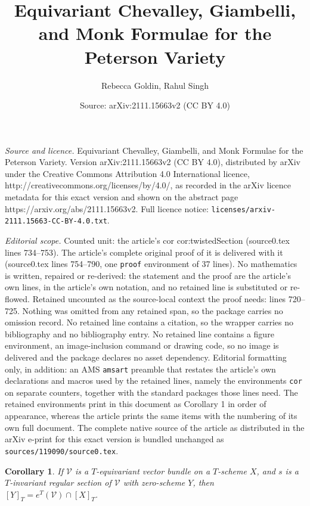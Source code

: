 \documentclass[10pt,a4paper]{amsart}
\title{Equivariant Chevalley, Giambelli, and Monk Formulae for the Peterson Variety}
\author{Rebecca Goldin, Rahul Singh}
\date{Source: arXiv:2111.15663v2 (CC BY 4.0)}
\newtheorem{cor}{Corollary}
\begin{document}
\maketitle

\noindent\emph{Source and licence.} Equivariant Chevalley, Giambelli, and Monk Formulae for the Peterson Variety. Version arXiv:2111.15663v2 (CC BY 4.0), distributed by arXiv under the Creative Commons Attribution 4.0 International licence, http://creativecommons.org/licenses/by/4.0/, as recorded in the arXiv licence metadata for this exact version and shown on the abstract page https://arxiv.org/abs/2111.15663v2. Full licence notice: \texttt{licenses/arxiv-2111.15663-CC-BY-4.0.txt}.\par\smallskip

\noindent\textit{Editorial scope.} Counted unit: the article's cor cor:twistedSection (source0.tex lines 734--753). The article's complete original proof of it is delivered with it (source0.tex lines 754--790, one \texttt{proof} environment of 37 lines). No mathematics is written, repaired or re-derived: the statement and the proof are the article's own lines, in the article's own notation, and no retained line is substituted or re-flowed.  Retained uncounted as the source-local context the proof needs: lines 720--725.  Nothing was omitted from any retained span, so the package carries no omission record.  No retained line contains a citation, so the wrapper carries no bibliography and no bibliography entry.  No retained line contains a figure environment, an image-inclusion command or drawing code, so no image is delivered and the package declares no asset dependency.  Editorial formatting only, in addition: an AMS \texttt{amsart} preamble that restates the article's own declarations and macros used by the retained lines, namely the environments \texttt{cor} on separate counters, together with the standard packages those lines need.  The retained environments print in this document as Corollary 1 in order of appearance, whereas the article prints the same items with the numbering of its own full document.  The complete native source of the article as distributed in the arXiv e-print for this exact version is bundled unchanged as \texttt{sources/119090/source0.tex}.
\begin{cor}
\label{cor:EulerClass}
If $\mathcal V$ is a $T$-equivariant vector bundle on a $T$-scheme $X$,
and $s$ is a $T$-invariant regular section of $\mathcal V$ with zero-scheme $Y$,
then $[Y]_T=e^T(\mathcal V)\cap[X]_T$.
\end{cor}
\end{document}
